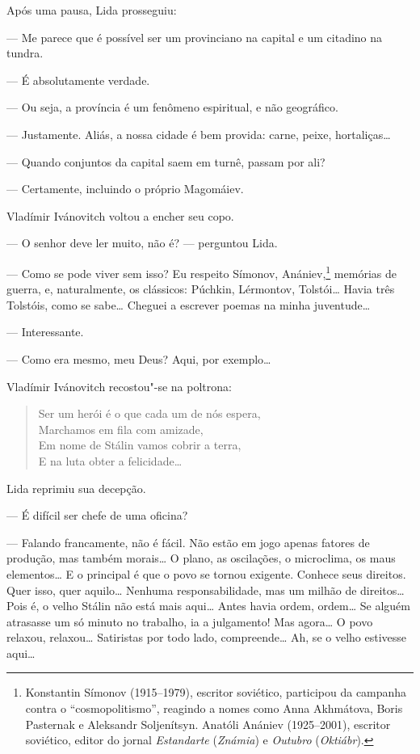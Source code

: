 Após uma pausa, Lida prosseguiu:

--- Me parece que é possível ser um provinciano na capital e um citadino
na tundra.

--- É absolutamente verdade.

--- Ou seja, a província é um fenômeno espiritual, e não geográfico.

--- Justamente. Aliás, a nossa cidade é bem provida: carne, peixe,
hortaliças\ldots{}

--- Quando conjuntos da capital saem em turnê, passam por ali?

--- Certamente, incluindo o próprio Magomáiev.

Vladímir Ivánovitch voltou a encher seu copo.

--- O senhor deve ler muito, não é? --- perguntou Lida.

--- Como se pode viver sem isso? Eu respeito Símonov, Anániev,\footnote{Konstantin
  Símonov (1915--1979), escritor soviético, participou da campanha
  contra o ``cosmopolitismo'', reagindo a nomes como Anna Akhmátova,
  Boris Pasternak e Aleksandr Soljenítsyn. Anatóli Anániev (1925--2001),
  escritor soviético, editor do jornal \emph{Estandarte} (\emph{Známia})
  e \emph{Outubro} (\emph{Oktiábr}).} memórias de guerra, e,
naturalmente, os clássicos: Púchkin, Lérmontov, Tolstói\ldots{} Havia três
Tolstóis, como se sabe\ldots{} Cheguei a escrever poemas na minha
juventude\ldots{}

--- Interessante.

--- Como era mesmo, meu Deus? Aqui, por exemplo\ldots{}

Vladímir Ivánovitch recostou"-se na poltrona:

\begin{verse}
Ser um herói é o que cada um de nós espera,\\
Marchamos em fila com amizade,\\
Em nome de Stálin vamos cobrir a terra,\\
E na luta obter a felicidade\ldots{}
\end{verse}

Lida reprimiu sua decepção.

--- É difícil ser chefe de uma oficina?

--- Falando francamente, não é fácil. Não estão em jogo apenas fatores
de produção, mas também morais\ldots{} O plano, as oscilações, o microclima,
os maus elementos\ldots{} E o principal é que o povo se tornou exigente.
Conhece seus direitos. Quer isso, quer aquilo\ldots{} Nenhuma
responsabilidade, mas um milhão de direitos\ldots{} Pois é, o velho Stálin
não está mais aqui\ldots{} Antes havia ordem, ordem\ldots{} Se alguém atrasasse um
só minuto no trabalho, ia a julgamento! Mas agora\ldots{} O povo relaxou,
relaxou\ldots{} Satiristas por todo lado, compreende\ldots{} Ah, se o velho
estivesse aqui\ldots{}

